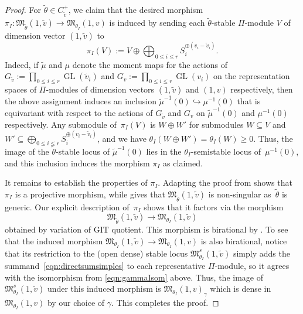 \documentclass[11pt]{article}
\numberwithin{equation}{section}
\newcommand{\GL}{\operatorname{GL}}
\numberwithin{equation}{section}
\begin{document}
\begin{proof}
For
 $\widetilde\theta\in C_{\widetilde v}^+$, we claim that the desired morphism $\pi_I\colon \mathfrak{M}_{\widetilde{\theta}}(1,\widetilde{v})\to \mathfrak{M}_{\theta_I}(1,v)$ is induced by sending each $\tilde{\theta}$-stable $\Pi$-module $V$ of dimension vector $(1,\tilde{v})$ to
 \[
 \pi_I(V):=V\oplus\bigoplus_{0\leq i\leq r}S_i^{\oplus(v_i-\tilde{v}_i)}.
 \]
 Indeed, if $\tilde{\mu}$ and $\mu$ denote the moment maps for the actions of $G_{\tilde{v}}:=\prod_{0\leq i\leq r}\GL(\tilde{v}_i)$ and $G_{v}:=\prod_{0\leq i\leq r}\GL(v_i)$ on the representation spaces of $\Pi$-modules of dimension vectors $(1,\tilde{v})$ and $(1,v)$ respectively, then the above assignment induces an inclusion $\tilde{\mu}^{-1}(0)\hookrightarrow \mu^{-1}(0)$ that is equivariant with respect to the actions of $G_{\tilde{v}}$ and $G_v$ on $\tilde{\mu}^{-1}(0)$ and $\mu^{-1}(0)$ respectively. Any submodule of~$\pi_I(V)$ is $W\oplus W'$ for submodules $W\subseteq V$ and $W'\subseteq \bigoplus_{0\leq i\leq r}S_i^{\oplus(v_i-\tilde{v}_i)}$, and we have $\theta_I(W\oplus W') = \theta_I(W)\geq 0$. Thus, the image of the $\tilde{\theta}$-stable locus of $\tilde{\mu}^{-1}(0)$ lies in the $\theta_I$-semistable locus of~$\mu^{-1}(0)$, and this inclusion induces the morphism $\pi_I$ as claimed.

 It remains to establish the properties of $\pi_I$. Adapting the proof from \cite[Lemma~2.4]{bellamy2016symplectic} shows that~$\pi_I$ is a projective morphism, while \cite[Theorem~1.15]{bellamy2016symplectic} gives that $ \mathfrak{M}_{\widetilde{\theta}}(1,\widetilde{v})$ is non-singular as~$\widetilde{\theta}$ is generic. Our explicit description of~$\pi_I$ shows that it factors via the morphism
\begin{equation*}%
\mathfrak{M}_{\widetilde{\theta}}(1,\widetilde{v}) \to \mathfrak{M}_{\theta_I}(1,\widetilde{v})
\end{equation*}
obtained by variation of GIT quotient. This morphism is birational by \cite[Lemma~2.12]{nakajima2009quiver}. To see that the induced morphism $\mathfrak{M}_{\theta_I}(1,\widetilde{v}) \to \mathfrak{M}_{\theta_I}(1,v)$ is also birational, notice that its restriction to the (open dense) stable locus $\mathfrak{M}^s_{\theta_I}(1,\widetilde{v})$ simply adds the summand~\eqref{eqn:directsumsimples} to each representative $\Pi$-module, so it agrees with the isomorphism from \eqref{eqn:gammaIsom} above. Thus, the image of $\mathfrak{M}^s_{\theta_I}(1,\widetilde{v})$ under this induced morphism is $\mathfrak{M}_{\theta_I}(1,v)_\gamma$ which is dense in $\mathfrak{M}_{\theta_I}(1,v)$ by our choice of $\gamma$. This completes the proof.
 \end{proof}
\end{document}
